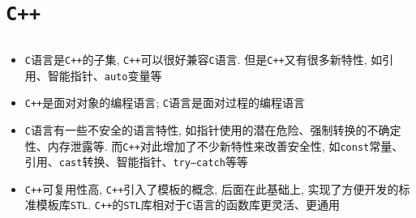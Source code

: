 \newpage
\thispagestyle{fancy}
\setcounter{page}{1}
\chapter{\tt C++}
\thispagestyle{fancy}

\section[基础]{\color{blue}{基础}}
\subsection[ISOK:{\tt C}和{\tt C++}区别]{}
\begin{itemize}
	\item {\tt C}语言是{\tt C++}的子集, {\tt C++}可以很好兼容{\tt C}语言. 但是{\tt C++}又有很多新特性, 如引用、智能指针、{\tt auto}变量等
	\item {\tt C++}是面对对象的编程语言; {\tt C}语言是面对过程的编程语言
	\item {\tt C}语言有一些不安全的语言特性, 如指针使用的潜在危险、强制转换的不确定性、内存泄露等. 而{\tt C++}对此增加了不少新特性来改善安全性, 如{\tt const}常量、引用、{\tt cast}转换、智能指针、{\tt try—catch}等等
	\item {\tt C++}可复用性高, {\tt C++}引入了模板的概念, 后面在此基础上, 实现了方便开发的标准模板库{\tt STL}. {\tt C++}的{\tt STL}库相对于{\tt C}语言的函数库更灵活、更通用
\end{itemize}

